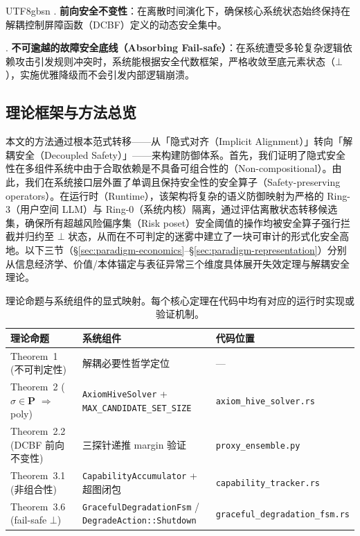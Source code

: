 \documentclass[letterpaper,twocolumn,10pt]{article}
\begin{document}
\begin{CJK}{UTF8}{gbsn}
. \textbf{前向安全不变性}：在离散时间演化下，确保核心系统状态始终保持在解耦控制屏障函数（DCBF）定义的动态安全集中。

. \textbf{不可逾越的故障安全底线（Absorbing Fail-safe）}：在系统遭受多轮复杂逻辑依赖攻击引发规则冲突时，系统能根据安全代数框架，严格收敛至底元素状态（$\bot$），实施优雅降级而不会引发内部逻辑崩溃。

\subsection{理论框架与方法总览}
\label{sec:paradigm-overview}

本文的方法通过根本范式转移——从「隐式对齐（Implicit Alignment）」转向「解耦安全（Decoupled Safety）」——来构建防御体系。首先，我们证明了隐式安全性在多组件系统中由于合取依赖是不具备可组合性的（Non-compositional）。由此，我们在系统接口层外置了单调且保持安全性的安全算子（Safety-preserving operators）。在运行时（Runtime），该架构将复杂的语义防御映射为严格的 Ring-3（用户空间 LLM）与 Ring-0（系统内核）隔离，通过评估离散状态转移候选集，确保所有超越风险偏序集（Risk poset）安全阈值的操作均被安全算子强行拦截并归约至 $\bot$ 状态，从而在不可判定的迷雾中建立了一块可审计的形式化安全高地。以下三节（\S\ref{sec:paradigm-economics}--\S\ref{sec:paradigm-representation}）分别从信息经济学、价值/本体锚定与表征异常三个维度具体展开失效定理与解耦安全理论。

\begin{table}[t]
\centering
\small
\setlength{\tabcolsep}{2pt}
\begin{tabular}{@{}p{2.2cm}p{3.0cm}p{2.8cm}@{}}
\toprule
\textbf{理论命题} & \textbf{系统组件} & \textbf{代码位置} \\
\midrule
Theorem~1 (不可判定性) & 解耦必要性哲学定位 & --- \\
Theorem~2 ($\sigma \in \mathbf{P}$ $\Rightarrow$ poly) & \texttt{AxiomHiveSolver} + \texttt{MAX\_CANDIDATE\_SET\_SIZE} & \texttt{axiom\_hive\_solver.rs} \\
Theorem~2.2 (DCBF 前向不变性) & 三探针递推 margin 验证 & \texttt{proxy\_ensemble.py} \\
Theorem~3.1 (非组合性) & \texttt{CapabilityAccumulator} + 超图闭包 & \texttt{capability\_tracker.rs} \\
Theorem~3.6 (fail-safe $\bot$) & \texttt{GracefulDegradationFsm} / \texttt{DegradeAction::Shutdown} & \texttt{graceful\_degradation\_fsm.rs} \\
\bottomrule
\end{tabular}
\caption{理论命题与系统组件的显式映射。每个核心定理在代码中均有对应的运行时实现或验证机制。}
\label{tab:theory-system-map}
\end{table}


\end{CJK}
\end{document}
